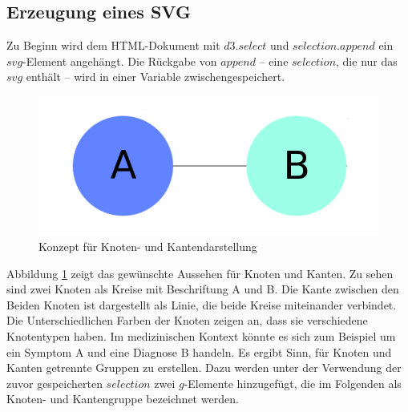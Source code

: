 \subsection{Erzeugung eines SVG}\label{sec:svgcreate}
Zu Beginn wird dem HTML-Dokument mit $d3.select$ und $selection.append$ ein $svg$-Element angehängt. Die Rückgabe von $append$ -- eine $selection$, die nur das $svg$ enthält -- wird in einer Variable zwischengespeichert.

\begin{figure}
	\centering
	\includegraphics[width=\linewidth]{../screenshots/knotendesign.PNG}
	\caption{Konzept für Knoten- und Kantendarstellung}
	\label{abb:design}
\end{figure} 
Abbildung \ref{abb:design} zeigt das gewünschte Aussehen für Knoten und Kanten. Zu sehen sind zwei Knoten als Kreise mit Beschriftung A und B. Die Kante zwischen den Beiden Knoten ist dargestellt als Linie, die beide Kreise miteinander verbindet. Die Unterschiedlichen Farben der Knoten zeigen an, dass sie verschiedene Knotentypen haben. Im medizinischen Kontext könnte es sich zum Beispiel um ein Symptom A und eine Diagnose B handeln. Es ergibt Sinn, für Knoten und Kanten getrennte Gruppen zu erstellen. Dazu werden unter der Verwendung der zuvor gespeicherten $selection$ zwei $g$-Elemente hinzugefügt, die im Folgenden als Knoten- und Kantengruppe bezeichnet werden.


